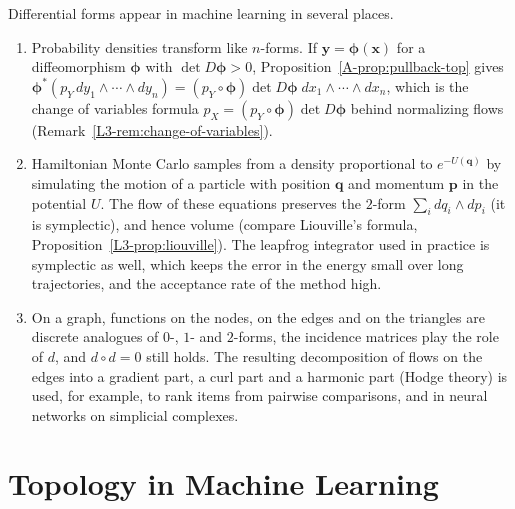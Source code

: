 \begin{remark}
    Differential forms appear in machine learning in several places.
    \begin{enumerate}
        \item Probability densities transform like $n$-forms. If $\mathbf{y} = \boldsymbol{\phi}(\mathbf{x})$ for a diffeomorphism $\boldsymbol{\phi}$ with $\det D\boldsymbol{\phi} > 0$, Proposition~\ref{A-prop:pullback-top} gives $\boldsymbol{\phi}^*(p_Y\, dy_1 \wedge \cdots \wedge dy_n) = (p_Y \circ \boldsymbol{\phi}) \det D\boldsymbol{\phi}\; dx_1 \wedge \cdots \wedge dx_n$, which is the change of variables formula $p_X = (p_Y \circ \boldsymbol{\phi}) \det D\boldsymbol{\phi}$ behind normalizing flows (Remark~\ref{L3-rem:change-of-variables}).
        \item Hamiltonian Monte Carlo samples from a density proportional to $e^{-U(\mathbf{q})}$ by simulating the motion of a particle with position $\mathbf{q}$ and momentum $\mathbf{p}$ in the potential $U$. The flow of these equations preserves the $2$-form $\sum_i dq_i \wedge dp_i$ (it is symplectic), and hence volume (compare Liouville's formula, Proposition~\ref{L3-prop:liouville}). The leapfrog integrator used in practice is symplectic as well, which keeps the error in the energy small over long trajectories, and the acceptance rate of the method high.
        \item On a graph, functions on the nodes, on the edges and on the triangles are discrete analogues of $0$-, $1$- and $2$-forms, the incidence matrices play the role of $d$, and $d \circ d = 0$ still holds. The resulting decomposition of flows on the edges into a gradient part, a curl part and a harmonic part (Hodge theory) is used, for example, to rank items from pairwise comparisons, and in neural networks on simplicial complexes.
    \end{enumerate}
\end{remark}

\section{Topology in Machine Learning}\label{A-sec:ml}

